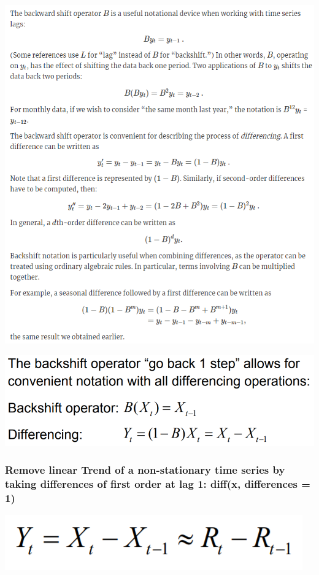 \documentclass[
]{article}
\begin{document}
\includegraphics[width=1\linewidth]{backnotation}

\includegraphics[width=13.96in]{backshift}

\hypertarget{remove-linear-trend-of-a-non-stationary-time-series-by-taking-differences-of-first-order-at-lag-1-diffx-differences-1}{%
\subsubsection{Remove linear Trend of a non-stationary time series by
taking differences of first order at lag 1: diff(x, differences =
1)}\label{remove-linear-trend-of-a-non-stationary-time-series-by-taking-differences-of-first-order-at-lag-1-diffx-differences-1}}

\includegraphics[width=0.5\linewidth]{diff_trend}
\end{document}
